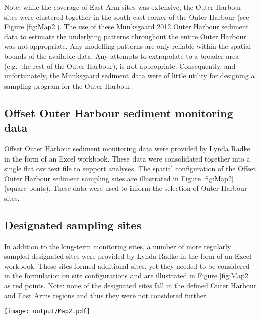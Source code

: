 \documentclass[a4paper]{article}
\let\origfigure=\figure
\let\endorigfigure=\endfigure
\renewenvironment{figure}[1][]{%
   \origfigure[H]
}{%
   \endorigfigure
}
\begin{document}
Note: while the coverage of East Arm sites was extensive, the Outer
Harbour sites were clustered together in the south east corner of the
Outer Harbour (see Figure \ref{fig:Map2}). The use of these Munksgaard
2012 Outer Harbour sediment data to estimate the underlying patterns
throughout the entire Outer Harbour was not appropriate. Any modelling
patterns are only reliable within the spatial bounds of the available
data. Any attempts to extrapolate to a broader area (e.g.~the rest of
the Outer Harbour), is not appropriate. Consequently, and unfortunately,
the Munksgaard sediment data were of little utility for designing a
sampling program for the Outer Harbour.

\hypertarget{offset-outer-harbour-sediment-monitoring-data}{%
\subsection{Offset Outer Harbour sediment monitoring
data}\label{offset-outer-harbour-sediment-monitoring-data}}

Offset Outer Harbour sediment monitoring data were provided by Lynda
Radke in the form of an Excel workbook. These data were consolidated
together into a single flat csv text file to support analyses. The
spatial configuration of the Offset Outer Harbour sediment sampling
sites are illustrated in Figure \ref{fig:Map2} (square ponts). These
data were used to inform the selection of Outer Harbour sites.

\hypertarget{designated-sampling-sites}{%
\subsection{Designated sampling sites}\label{designated-sampling-sites}}

In addition to the long-term monitoring sites, a number of more
regularly sampled designated sites were provided by Lynda Radke in the
form of an Excel workbook. These sites formed additional sites, yet they
needed to be considered in the formulation on site configurations and
are illustrated in Figure \ref{fig:Map2} as red points. Note: none of
the designated sites fall in the defined Outer Harbour and East Arms
regions and thus they were not considered further.

\begin{figure}
\centering\scriptsize
\texttt{[image: output/Map2.pdf]}
\caption{Map of Darwin Harbour indicating the spatial configuration of
Munksgaard 2012 sediment monitoring sites (dots). Solid dots signify
sites within the Outer Harbour and East Arm focal areas. Black circular
points represent Munksgaard 2012 sediment sampling sites, square points
represent Offset Outer Harbour sediment sites and red points represent
designated sites.\label{fig:Map2}}
\end{figure}
\end{document}
